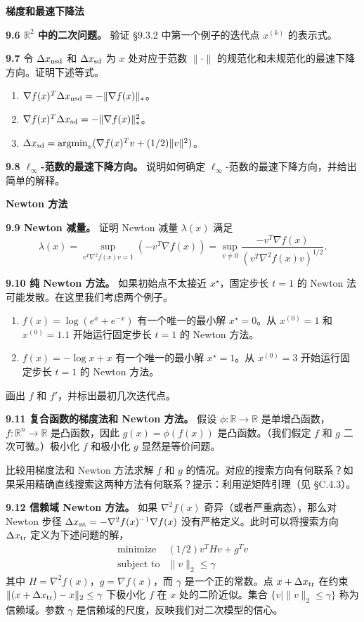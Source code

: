 \documentclass[UTF8,12pt,a4paper,fontset=fandol]{ctexart}
\begin{document}
\noindent\textbf{梯度和最速下降法}

\noindent\textbf{9.6 $\mathbb{R}^2$ 中的二次问题。}\quad
验证 \S9.3.2 中第一个例子的迭代点 $x^{(k)}$ 的表示式。

\noindent\textbf{9.7}\quad
令 $\Delta x_{\rm nsd}$ 和 $\Delta x_{\rm sd}$ 为 $x$ 处对应于范数 $\|\cdot\|$ 的规范化和未规范化的最速下降方向。证明下述等式。
\begin{enumerate}
\item[(a)] $\nabla f(x)^T\Delta x_{\rm nsd}=-\|\nabla f(x)\|_\ast$。
\item[(b)] $\nabla f(x)^T\Delta x_{\rm sd}=-\|\nabla f(x)\|_\ast^2$。
\item[(c)] $\Delta x_{\rm sd}=\operatorname*{argmin}_v(\nabla f(x)^Tv+(1/2)\|v\|^2)$。
\end{enumerate}

\noindent\textbf{9.8 $\ell_\infty$-范数的最速下降方向。}\quad
说明如何确定 $\ell_\infty$-范数的最速下降方向，并给出简单的解释。

\noindent\textbf{Newton 方法}

\noindent\textbf{9.9 Newton 减量。}\quad
证明 Newton 减量 $\lambda(x)$ 满足
\[
\lambda(x)=\sup_{v^T\nabla^2 f(x)v=1}(-v^T\nabla f(x))
=\sup_{v\neq0}\frac{-v^T\nabla f(x)}{(v^T\nabla^2 f(x)v)^{1/2}}.
\]

\noindent\textbf{9.10 纯 Newton 方法。}\quad
如果初始点不太接近 $x^\star$，固定步长 $t=1$ 的 Newton 法可能发散。在这里我们考虑两个例子。
\begin{enumerate}
\item[(a)] $f(x)=\log(e^x+e^{-x})$ 有一个唯一的最小解 $x^\star=0$。从 $x^{(0)}=1$ 和 $x^{(0)}=1.1$ 开始运行固定步长 $t=1$ 的 Newton 方法。
\item[(b)] $f(x)=-\log x+x$ 有一个唯一的最小解 $x^\star=1$。从 $x^{(0)}=3$ 开始运行固定步长 $t=1$ 的 Newton 方法。
\end{enumerate}
画出 $f$ 和 $f'$，并标出最初几次迭代点。

\noindent\textbf{9.11 复合函数的梯度法和 Newton 方法。}\quad
假设 $\phi:\mathbb{R}\to\mathbb{R}$ 是单增凸函数，$f:\mathbb{R}^n\to\mathbb{R}$ 是凸函数，因此 $g(x)=\phi(f(x))$ 是凸函数。（我们假定 $f$ 和 $g$ 二次可微。）极小化 $f$ 和极小化 $g$ 显然是等价问题。

比较用梯度法和 Newton 方法求解 $f$ 和 $g$ 的情况。对应的搜索方向有何联系？如果采用精确直线搜索这两种方法有何联系？提示：利用逆矩阵引理（见 \S C.4.3）。

\noindent\textbf{9.12 信赖域 Newton 方法。}\quad
如果 $\nabla^2 f(x)$ 奇异（或者严重病态），那么对 Newton 步径 $\Delta x_{\rm nt}=-\nabla^2 f(x)^{-1}\nabla f(x)$ 没有严格定义。此时可以将搜索方向 $\Delta x_{\rm tr}$ 定义为下述问题的解，
\[
\begin{array}{ll}
\mbox{minimize} & (1/2)v^THv+g^Tv\\
\mbox{subject to} & \|v\|_2\leq\gamma
\end{array}
\]
其中 $H=\nabla^2 f(x)$，$g=\nabla f(x)$，而 $\gamma$ 是一个正的常数。点 $x+\Delta x_{\rm tr}$ 在约束 $\|(x+\Delta x_{\rm tr})-x\|_2\leq\gamma$ 下极小化 $f$ 在 $x$ 处的二阶近似。集合 $\{v\mid \|v\|_2\leq\gamma\}$ 称为信赖域。参数 $\gamma$ 是信赖域的尺度，反映我们对二次模型的信心。
\end{document}
